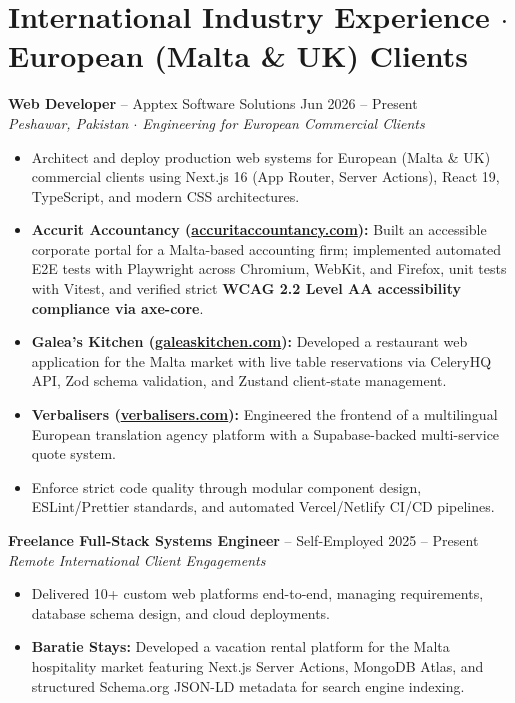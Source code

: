 \documentclass[10pt,a4paper]{article}
\begin{document}
\newpage

\section{International Industry Experience $\cdot$ European (Malta \& UK) Clients}

\textbf{Web Developer} -- Apptex Software Solutions \hfill Jun 2026 -- Present \\
\textit{Peshawar, Pakistan $\cdot$ Engineering for European Commercial Clients}
\begin{itemize}
    \item Architect and deploy production web systems for European (Malta \& UK) commercial clients using Next.js 16 (App Router, Server Actions), React 19, TypeScript, and modern CSS architectures.
    \item \textbf{Accurit Accountancy (\href{https://accuritaccountancy.com}{accuritaccountancy.com}):} Built an accessible corporate portal for a Malta-based accounting firm; implemented automated E2E tests with Playwright across Chromium, WebKit, and Firefox, unit tests with Vitest, and verified strict \textbf{WCAG 2.2 Level AA accessibility compliance via axe-core}.
    \item \textbf{Galea's Kitchen (\href{https://galeaskitchen.com}{galeaskitchen.com}):} Developed a restaurant web application for the Malta market with live table reservations via CeleryHQ API, Zod schema validation, and Zustand client-state management.
    \item \textbf{Verbalisers (\href{https://verbalisers.com}{verbalisers.com}):} Engineered the frontend of a multilingual European translation agency platform with a Supabase-backed multi-service quote system.
    \item Enforce strict code quality through modular component design, ESLint/Prettier standards, and automated Vercel/Netlify CI/CD pipelines.
\end{itemize}

\vspace{4pt}
\textbf{Freelance Full-Stack Systems Engineer} -- Self-Employed \hfill 2025 -- Present \\
\textit{Remote International Client Engagements}
\begin{itemize}
    \item Delivered 10+ custom web platforms end-to-end, managing requirements, database schema design, and cloud deployments.
    \item \textbf{Baratie Stays:} Developed a vacation rental platform for the Malta hospitality market featuring Next.js Server Actions, MongoDB Atlas, and structured Schema.org JSON-LD metadata for search engine indexing.
\end{itemize}
\end{document}
